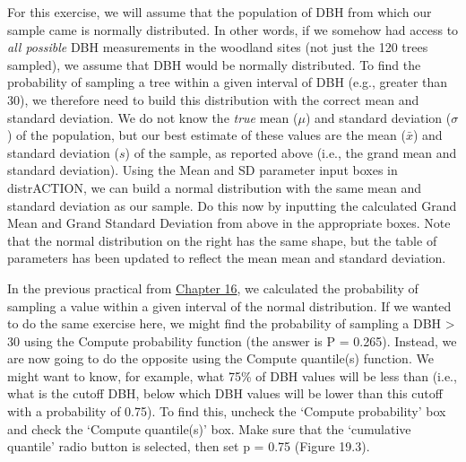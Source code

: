 \documentclass[
]{scrbook}
\begin{document}
For this exercise, we will assume that the population of DBH from which our sample came is normally distributed.
In other words, if we somehow had access to \emph{all possible} DBH measurements in the woodland sites (not just the 120 trees sampled), we assume that DBH would be normally distributed.
To find the probability of sampling a tree within a given interval of DBH (e.g., greater than 30), we therefore need to build this distribution with the correct mean and standard deviation.
We do not know the \emph{true} mean (\(\mu\)) and standard deviation (\(\sigma\)) of the population, but our best estimate of these values are the mean (\(\bar{x}\)) and standard deviation (\(s\)) of the sample, as reported above (i.e., the grand mean and standard deviation).
Using the Mean and SD parameter input boxes in distrACTION, we can build a normal distribution with the same mean and standard deviation as our sample.
Do this now by inputting the calculated Grand Mean and Grand Standard Deviation from above in the appropriate boxes.
Note that the normal distribution on the right has the same shape, but the table of parameters has been updated to reflect the mean mean and standard deviation.

In the previous practical from \protect\hyperlink{Chapter_16}{Chapter 16}, we calculated the probability of sampling a value within a given interval of the normal distribution.
If we wanted to do the same exercise here, we might find the probability of sampling a DBH \textgreater{} 30 using the Compute probability function (the answer is P = 0.265).
Instead, we are now going to do the opposite using the Compute quantile(s) function.
We might want to know, for example, what 75\% of DBH values will be less than (i.e., what is the cutoff DBH, below which DBH values will be lower than this cutoff with a probability of 0.75).
To find this, uncheck the `Compute probability' box and check the `Compute quantile(s)' box.
Make sure that the `cumulative quantile' radio button is selected, then set p = 0.75 (Figure 19.3).
\end{document}
